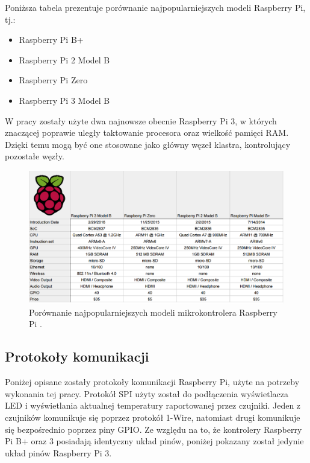 \documentclass[12pt]{report}
\let\Oldsubsection\subsection
\renewcommand{\subsection}{\FloatBarrier\Oldsubsection}
\begin{document}
{\noindent Poniższa tabela prezentuje porównanie najpopularniejszych modeli Raspberry Pi, tj.:
\begin{itemize}
\item{Raspberry Pi B+}
\item{Raspberry Pi 2 Model B}
\item{Raspberry Pi Zero}
\item{Raspberry Pi 3 Model B}
\end{itemize}

W pracy zostały użyte dwa najnowsze obecnie Raspberry Pi 3, w których znaczącej poprawie uległy taktowanie procesora oraz wielkość pamięci RAM. Dzięki temu mogą być one stosowane jako główny węzeł klastra, kontrolujący pozostałe węzły.

\begin{figure}[h]
	\centering
	\includegraphics[width=1.05\textwidth]{images/rpiComparison.png}
	\caption{Porównanie najpopularniejszych modeli mikrokontrolera Raspberry Pi \cite{rpiComparisonImg}.}
\end{figure}

\subsection{Protokoły komunikacji}
Poniżej opisane zostały protokoły komunikacji Raspberry Pi, użyte na potrzeby wykonania tej pracy. Protokół SPI użyty został do podłączenia wyświetlacza LED i wyświetlania aktualnej temperatury raportowanej przez czujniki. Jeden z czujników komunikuje się poprzez protokół 1-Wire, natomiast drugi komunikuje się bezpośrednio poprzez piny GPIO.
Ze względu na to, że kontrolery Raspberry Pi B+ oraz 3 posiadają identyczny układ pinów, poniżej pokazany został jedynie układ pinów Raspberry Pi 3.

}
\end{document}
